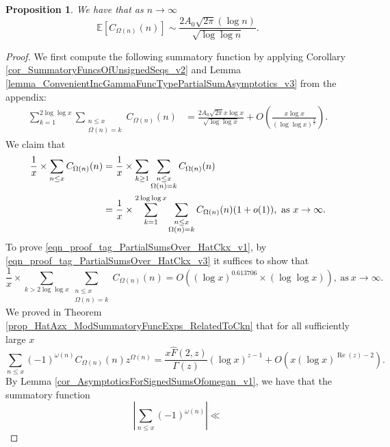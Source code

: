 \documentclass[11pt,reqno,a4letter]{article}
\numberwithin{figure}{section}
\numberwithin{table}{section}
\theoremstyle{plain}
\newtheorem{prop}[theorem]{Proposition}
\numberwithin{theorem}{section}
\theoremstyle{definition}
\renewcommand{\Re}{\operatorname{Re}}
\begin{document}
\begin{prop} 
\label{lemma_HatCAstxSum_ExactFormulaWithError_v1} 
We have that as $n \rightarrow \infty$ 
\[
\mathbb{E}\left[C_{\Omega(n)}(n)\right] \sim 
     \frac{2A_0 \sqrt{2\pi} (\log n)}{\sqrt{\log\log n}}. 
\] 
\end{prop} 
\begin{proof} 
We first compute the following 
summatory function by applying 
Corollary \ref{cor_SummatoryFuncsOfUnsignedSeqs_v2} and 
Lemma \ref{lemma_ConvenientIncGammaFuncTypePartialSumAsymptotics_v3} from the appendix:
\begin{align} 
\label{eqn_proof_tag_PartialSumsOver_HatCkx_v3} 
\sum_{k=1}^{2\log\log x} \sum_{\substack{n \leq x \\ \Omega(n) = k}} C_{\Omega(n)}(n) & = 
     \frac{2A_0 \sqrt{2\pi} x \log x}{\sqrt{\log\log x}} + O\left(
     \frac{x \log x}{(\log\log x)^{\frac{3}{2}}}\right). 
\end{align} 
We claim that 
\begin{align} 
\notag 
\frac{1}{x} \times \sum_{n \leq x} C_{\Omega(n)}(n) & = \frac{1}{x} \times 
     \sum_{k \geq 1} \sum_{\substack{n \leq x \\ \Omega(n) = k}} C_{\Omega(n)}(n) \\ 
\label{eqn_proof_tag_PartialSumsOver_HatCkx_v1} 
     & = 
     \frac{1}{x} \times \sum_{k=1}^{2\log\log x} \sum_{\substack{n \leq x \\ \Omega(n) = k}} 
     C_{\Omega(n)}(n) (1+o(1)), 
     \text{ as } x \rightarrow \infty. 
\end{align} 
To prove \eqref{eqn_proof_tag_PartialSumsOver_HatCkx_v1}, by 
\eqref{eqn_proof_tag_PartialSumsOver_HatCkx_v3} it suffices to show that 
\begin{equation} 
\label{eqn_proof_tag_PartialSumsOver_HatCkx_EquivCond_v2} 
\frac{1}{x} \times 
     \sum\limits_{k > 2\log\log x} \sum\limits_{\substack{n \leq x \\ \Omega(n) = k}} C_{\Omega(n)}(n)
     = O\left((\log x)^{0.613706} \times (\log\log x)\right), 
     \mathrm{\ as\ } x \rightarrow \infty. 
\end{equation} 
We proved in Theorem \ref{prop_HatAzx_ModSummatoryFuncExps_RelatedToCkn} 
that for all sufficiently large $x$ 
\[
\sum_{n \leq x} (-1)^{\omega(n)} C_{\Omega(n)}(n) z^{\Omega(n)} = 
     \frac{x \widehat{F}(2, z)}{\Gamma(z)} (\log x)^{z-1} + O\left( 
     x (\log x)^{\Re(z)-2}\right). 
\]
By Lemma \ref{cor_AsymptoticsForSignedSumsOfomegan_v1}, 
we have that the summatory function 
\[
\left\lvert \sum_{n \leq x} (-1)^{\omega(n)} \right\rvert \ll 
\]
\end{proof}
\end{document}
